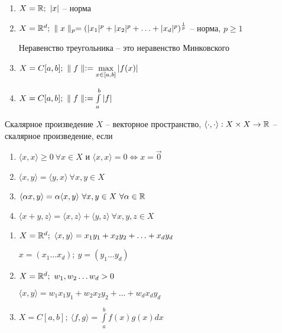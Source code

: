 \documentclass[12pt]{article}
\newcommand{\q}[1]{\langle #1 \rangle}
\begin{document}
\begin{Example}{}
    \begin{enumerate}
        \item $X = \mathbb R;\ |x|$ -- норма
        \item $X = \mathbb R^d;\ \parallel x \parallel_p = (|x_1|^p + |x_2|^p + \ldots + |x_d|^p)^{\frac{1}{p}}$ -- норма, $p \geq 1$
        
        Неравенство треугольника -- это неравенство Минковского

        \item $X = C[a, b];\ \parallel f \parallel := \max\limits_{x \in [a, b]} |f(x)|$
        \item $X = C[a, b];\ \parallel f \parallel := \int\limits_a^b |f|$
    \end{enumerate}
\end{Example}

\begin{defin}{Скалярное произведение}
    $X$ -- векторное пространство, $\q{\cdot, \cdot} : X \times X \to \R$ -- скалярное произведение, если

    \begin{enumerate}
        \item $\q{x, x} \geq 0\ \forall x \in X$ и $\q{x, x} = 0 \Leftrightarrow x = \overrightarrow{0}$
        \item $\q{x, y} = \q{y, x}\ \forall x, y \in X$
        \item $\q{\alpha x, y} = \alpha \q{x, y}\ \forall x, y \in X\ \forall \alpha \in \R$
        \item $\q{x + y, z} = \q{x, z} + \q{y, z}\ \forall x, y, z \in X$
    \end{enumerate}
\end{defin}

\begin{Example}{}
    \begin{enumerate}
        \item $X = \R^d;\ \q{x, y} = x_1y_1 + x_2y_2 + \ldots + x_dy_d$
        
        $x = (x_1 \ldots x_d);\ y = (y_1 \ldots y_d)$

        \item $X = \mathbb R^d;\ w_1, w_2 \ldots w_d > 0$
        
        $\q{x, y} = w_1x_1y_1 + w_2x_2y_2 + \ldots + w_dx_dy_d$

        \item $X = C[a, b];\ \q{f, g} = \int\limits_a^b f(x)g(x)dx$
    \end{enumerate}
\end{Example}
\end{document}
